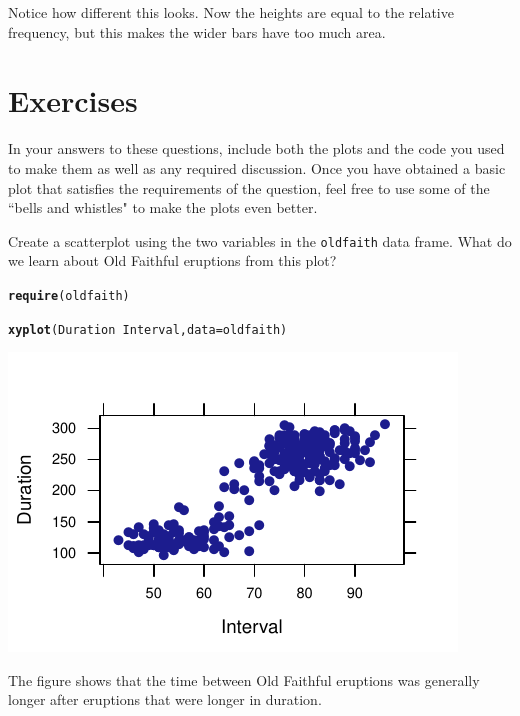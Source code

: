 \documentclass[twoside]{book}\usepackage[]{graphicx}\usepackage[]{xcolor}
\makeatletter
\def\maxwidth{ %
  \ifdim\Gin@nat@width>\linewidth
    \linewidth
  \else
    \Gin@nat@width
  \fi
}
\newcommand{\hlopt}[1]{\textcolor[rgb]{0,0,0}{#1}}%
\newcommand{\hlstd}[1]{\textcolor[rgb]{0.345,0.345,0.345}{#1}}%
\newcommand{\hlkwc}[1]{\textcolor[rgb]{0.333,0.667,0.333}{#1}}%
\newcommand{\hlkwd}[1]{\textcolor[rgb]{0.737,0.353,0.396}{\textbf{#1}}}%
\newenvironment{kframe}{%
 \def\at@end@of@kframe{}%
 \ifinner\ifhmode%
  \def\at@end@of@kframe{\end{minipage}}%
  \begin{minipage}{\columnwidth}%
 \fi\fi%
 \def\FrameCommand##1{\hskip\@totalleftmargin \hskip-\fboxsep
 \colorbox{shadecolor}{##1}\hskip-\fboxsep
     \hskip-\linewidth \hskip-\@totalleftmargin \hskip\columnwidth}%
 \MakeFramed {\advance\hsize-\width
   \@totalleftmargin\z@ \linewidth\hsize
   \@setminipage}}%
 {\par\unskip\endMakeFramed%
 \at@end@of@kframe}
\newenvironment{knitrout}{}{} %
\newcommand{\Rindex}[1]{\index{\texttt{#1}}}
\newcommand{\dataframe}[1]{{\color{blue!80!black}\texttt{#1}}\Rindex{#1}}
\makeatother
\begin{document}
Notice how different this looks.  Now the heights are equal to the relative
frequency, but this makes the wider bars have too much area.

\newpage

\section*{Exercises}

In your answers to these questions, include both the plots and the code you used 
to make them as well as any required discussion.  Once you have obtained a basic
plot that satisfies the requirements of the question, feel free to 
use some of the ``bells and whistles" to make the plots even better.

\begin{problem}
	Create a scatterplot using the two variables in the \dataframe{oldfaith}
	data frame.  What do we learn about Old Faithful eruptions from this plot?
\end{problem}

\begin{solution}
\begin{knitrout}
\color{fgcolor}\begin{kframe}
\begin{alltt}
\hlkwd{require}\hlstd{(oldfaith)}
\end{alltt}


{\ttfamily\noindent\itshape\color{messagecolor}{\#\# Loading required package: oldfaith}}

{\ttfamily\noindent\color{warningcolor}{\#\# Warning in library(package, lib.loc = lib.loc, character.only = TRUE, logical.return = TRUE, : there is no package called 'oldfaith'}}\begin{alltt}
\hlkwd{xyplot}\hlstd{(Duration} \hlopt{~} \hlstd{Interval,} \hlkwc{data}\hlstd{=oldfaith)}
\end{alltt}
\end{kframe}

{\centering \includegraphics[width=\maxwidth]{figures/fig-unnamed-chunk-19-1} 

}



\end{knitrout}
The figure shows that the time between Old Faithful eruptions was generally longer after eruptions that were longer in duration.
\end{solution}
\end{document}
